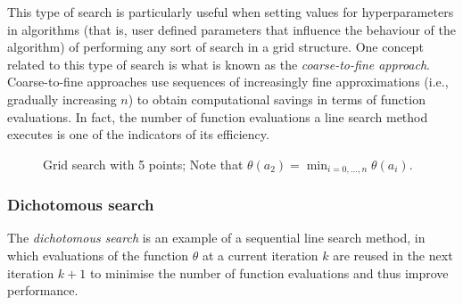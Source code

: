 This type of search is particularly useful when setting values for hyperparameters in algorithms (that is, user defined parameters that influence the behaviour of the algorithm) of performing any sort of search in a grid structure. One concept related to this type of search is what is known as the \emph{coarse-to-fine approach}. Coarse-to-fine approaches use sequences of increasingly fine approximations (i.e., gradually increasing $n$) to obtain computational savings in terms of function evaluations. In fact, the number of function evaluations a line search method executes is one of the indicators of its efficiency.
%
\begin{figure}[H]
	\centering
	\caption{Grid search with 5 points; Note that $\theta(a_2) = \min_{i=0,\dots,n} \theta(a_i)$.}	\label{fig:uniform_search}
\end{figure}
 
\subsubsection{Dichotomous search}

The \emph{dichotomous search} is an example of a sequential line search method, in which evaluations of the function $\theta$ at a current iteration $k$ are reused in the next iteration $k+1$ to minimise the number of function evaluations and thus improve performance. 

